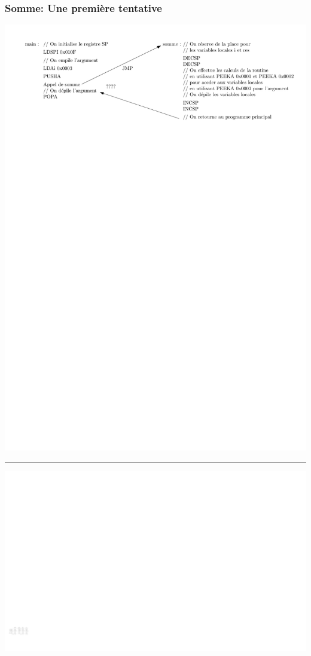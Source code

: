 \documentclass{beamer}
\begin{document}
\begin{frame}
\frametitle{Somme: Une première tentative}

\centering\includegraphics[width=\linewidth]{Figs/stack_args_noret.pdf}
\hrule
\centering\includegraphics[width=\linewidth]{Figs/stack_args_fig_no_ret.pdf}


\end{frame}
\end{document}
